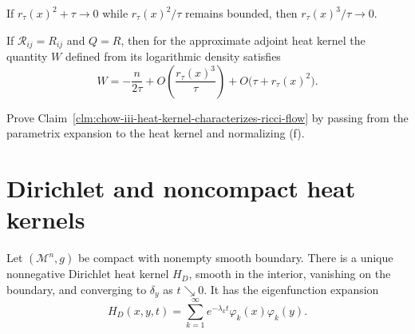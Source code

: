 \begin{remark}
\label{rem:chow-iii-cubic-over-time-error}
If \(r_\tau(x)^2+\tau\to0\) while \(r_\tau(x)^2/\tau\) remains bounded,
then \(r_\tau(x)^3/\tau\to0\).
\end{remark}

\begin{lemma}
\label{lem:chow-iii-adjoint-parametrix-ricci-asymptotics}
If \(\mathcal R_{ij}=R_{ij}\) and \(Q=R\), then for the approximate adjoint
heat kernel the quantity \(W\) defined from its logarithmic density satisfies
\[
 W=-\frac{n}{2\tau}
 +O\!\left(\frac{r_\tau(x)^3}{\tau}\right)
 +O\bigl(\tau+r_\tau(x)^2\bigr).
\]
\end{lemma}

\begin{claim}
\label{clm:chow-iii-prove-ricci-flow-characterization}
Prove Claim~\ref{clm:chow-iii-heat-kernel-characterizes-ricci-flow} by
passing from the parametrix expansion to the heat kernel and normalizing (f).
\end{claim}

\section{Dirichlet and noncompact heat kernels}

\begin{theorem}
\label{thm:chow-iii-static-dirichlet-heat-kernel}
Let \((\mathcal M^n,g)\) be compact with nonempty smooth boundary.  There is a
unique nonnegative Dirichlet heat kernel \(H_D\), smooth in the interior,
vanishing on the boundary, and converging to \(\delta_y\) as \(t\searrow0\).
It has the eigenfunction expansion
\[
 H_D(x,y,t)=\sum_{k=1}^\infty e^{-\lambda_kt}\varphi_k(x)\varphi_k(y).
\]
\end{theorem}

